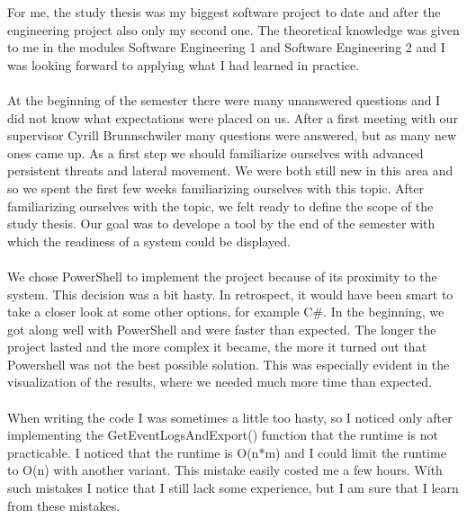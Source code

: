 \thispagestyle{plain}
\renewcommand\section{\stdsection}

For me, the study thesis was my biggest software project to date and after the engineering project also only my second one. The theoretical knowledge was given to me in the modules Software Engineering 1 and Software Engineering 2 and I was looking forward to applying what I had learned in practice. 
\\\\
At the beginning of the semester there were many unanswered questions and I did not know what expectations were placed on us. After a first meeting with our supervisor Cyrill Brunnschwiler many questions were answered, but as many new ones came up. As a first step we should familiarize ourselves with advanced persistent threats and lateral movement. We were both still new in this area and so we spent the first few weeks familiarizing ourselves with this topic. After familiarizing ourselves with the topic, we felt ready to define the scope of the study thesis. Our goal was to develope a tool by the end of the semester with which the readiness of a system could be displayed.
\\\\
We chose PowerShell to implement the project because of its proximity to the system. This decision was a bit hasty. In retrospect, it would have been smart to take a closer look at some other options, for example C\#. In the beginning, we got along well with PowerShell and were faster than expected. The longer the project lasted and the more complex it became, the more it turned out that Powershell was not the best possible solution. This was especially evident in the visualization of the results, where we needed much more time than expected.
\\\\
When writing the code I was sometimes a little too hasty, so I noticed only after implementing the GetEventLogsAndExport() function that the runtime is not practicable. I noticed that the runtime is O(n*m) and I could limit the runtime to O(n) with another variant. This mistake easily costed me a few hours. With such mistakes I notice that I still lack some experience, but I am sure that I learn from these mistakes.
\\\\
